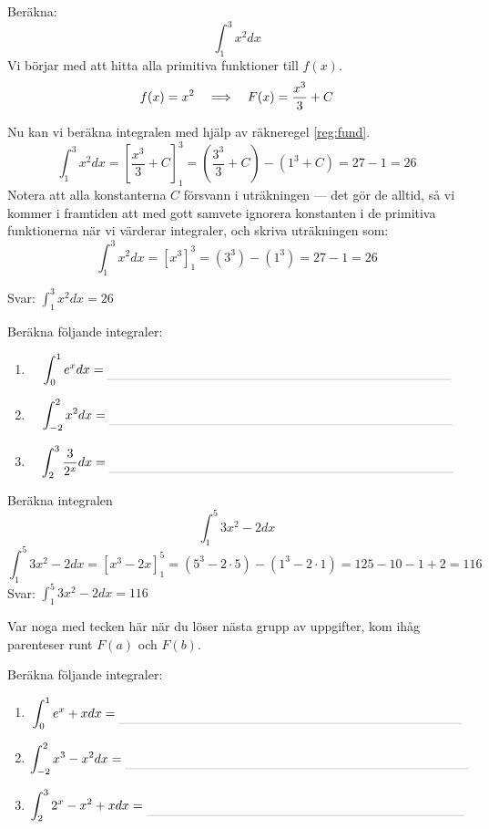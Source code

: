 \documentclass[a4paper, 12pt]{article}
\begin{document}
\begin{exempel}
    Beräkna: \[\int_1^3x^2dx\]
    \dinkus
    Vi börjar med att hitta alla primitiva funktioner till $f(x)$.
    \[f(x) = x^2 \hspace{1em} \Longrightarrow \hspace{1em} F(x) = \dfrac {x^3}3 + C\]

    Nu kan vi beräkna integralen med hjälp av räkneregel \ref{reg:fund}.
    \[\int_1^3x^2dx = \left[\dfrac{x^3}3 + C\right]_1^3 = \left(\dfrac{3^3}3 + C \right) - \left(1^3 + C\right) = 27 - 1 = 26\]
    Notera att alla konstanterna $C$ försvann i uträkningen --- det gör de alltid, så vi kommer i framtiden att med gott samvete ignorera konstanten i de primitiva funktionerna när vi värderar integraler, och skriva uträkningen som:
    \[\int_1^3x^2dx = \left[x^3\right]_1^3 = \left(3^3\right) - \left(1^3\right) = 27 - 1 = 26\]

    Svar: $\int_1^3x^2dx = 26$
\end{exempel}

\begin{uppgifter}
    \label{upp:int}
    Beräkna följande integraler:
    \begin{enumerate}
        \item \[\int_0^1e^xdx \ans[27] \]
        \item \[\int_{-2}^2x^2dx \ans[27]\]
        \item \[\int_2^3\dfrac 3{2^x}dx \ans[27]\]
    \end{enumerate}
\end{uppgifter}


\begin{exempel}
    Beräkna integralen 
    \[\int_{1}^{5}3x^2 - 2 dx\]
    \dinkus
    \[\int_{1}^{5}3x^2 - 2 dx = \left[x^3 - 2x\right]_1^5 = \left(5^3 - 2\cdot5\right)- \left(1^3 - 2\cdot 1\right) = 125 - 10 - 1 + 2 = 116\]
    Svar: $\int_{1}^{5}3x^2 - 2 dx = 116$
\end{exempel}

Var noga med tecken här när du löser nästa grupp av uppgifter, kom ihåg parenteser runt $F(a)$ och $F(b)$.

\begin{uppgifter}
    Beräkna följande integraler:
    \begin{enumerate}
        \item \[\int_0^1e^x+xdx \ans[27] \]
        \item \[\int_{-2}^2x^3-x^2dx \ans[27]\]
        \item \[\int_2^32^x - x^2 + x dx \ans[25]\]
    \end{enumerate}
\end{uppgifter}
\end{document}
